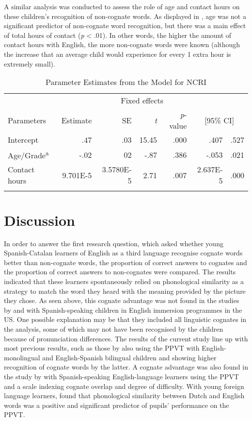\documentclass[output=paper,modfonts,nonflat,newtxmath]{langsci/langscibook}
\begin{document}
 {A similar analysis was conducted to assess the role of age and contact hours on these children’s recognition of non-cognate words. As displayed in , age was not a significant predictor of non-cognate word recognition, but there was a main effect of total hours of contact (}{\textit{p}} {< .01). In other words, the higher the amount of contact hours with English, the more non-cognate words were known (although the increase that an average child would experience for every 1 extra hour is extremely small).}

\begin{table}
\caption{Parameter Estimates from the Model for NCRI}
\label{tab:munoz:3}
\begin{tabularx}{\textwidth}{Xrrrrrr}
\lsptoprule
 & \multicolumn{5}{c}{{ {Fixed effects}}}\\
 \cmidrule{2-7}
Parameters & Estimate & SE & {\itshape t} & { {\textit{p}}{{}-value}} & \multicolumn{2}{c}{ [95\% CI]}\\
\midrule
Intercept & .47 & .03 & 15.45 & .000 & .407 & .527\\
Age/Grade\textsuperscript{a} & -.02 & 02 & -.87 & .386 & -.053 & .021\\
Contact hours & 9.701E-5 & 3.5780E-5 & 2.71 & .007 & 2.637E-5 & .000\\
\lspbottomrule
\end{tabularx}
\end{table}

\section{Discussion}

{In order to answer the first research question, which asked whether young Spanish-Catalan learners of English as a third language recognise cognate words better than non-cognate words, the proportion of correct answers to cognates and the proportion of correct answers to non-cognates were compared. The results indicated that these learners spontaneously relied on phonological similarity as a strategy to match the word they heard with the meaning provided by the picture they chose. As seen above, this cognate advantage was not found in the studies by \citet{UmbelEtAl1992} and \citet{UmbelOller1994} with Spanish-speaking children in English immersion programmes in the US. One possible explanation may be that they included all linguistic cognates in the analysis, some of which may not have been recognised by the children because of pronunciation differences. The results of the current study line up with most previous results, such as those by \citet{CunninghamGraham2000} also using the PPVT with English-monolingual and English-Spanish bilingual children and showing higher recognition of cognate words by the latter. A cognate advantage was also found in the study by \citet{KelleyKohnert2012} with Spanish-speaking English-language learners using the PPVT and a scale indexing cognate overlap and degree of difficulty. With young foreign language learners, \citet{GoriotEtAl2018} found that phonological similarity between Dutch and English words was a positive and significant predictor of pupils’ performance on the PPVT.}
\end{document}
